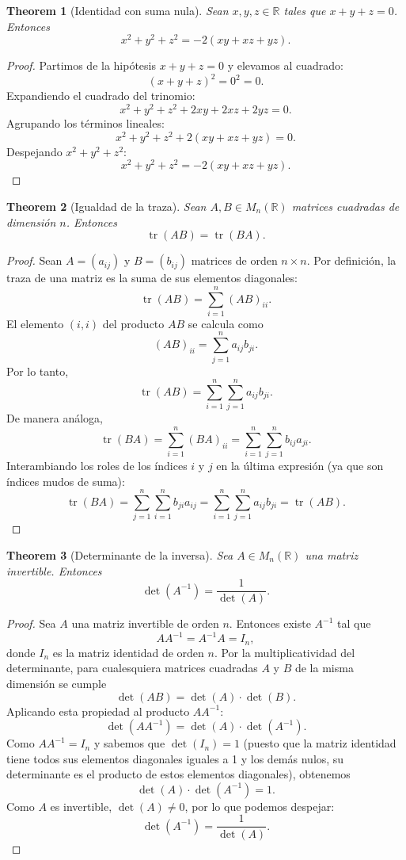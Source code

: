 \documentclass[11pt,a4paper]{article}
\theoremstyle{plain}
\newtheorem{theorem}{Theorem}[section]
\theoremstyle{definition}
\begin{document}
\begin{theorem}[Identidad con suma nula]
Sean $x, y, z \in \mathbb{R}$ tales que $x + y + z = 0$. Entonces
\[
x^2 + y^2 + z^2 = -2(xy + xz + yz).
\]
\end{theorem}

\begin{proof}
Partimos de la hipótesis $x + y + z = 0$ y elevamos al cuadrado:
\[
(x + y + z)^2 = 0^2 = 0.
\]
Expandiendo el cuadrado del trinomio:
\[
x^2 + y^2 + z^2 + 2xy + 2xz + 2yz = 0.
\]
Agrupando los términos lineales:
\[
x^2 + y^2 + z^2 + 2(xy + xz + yz) = 0.
\]
Despejando $x^2 + y^2 + z^2$:
\[
x^2 + y^2 + z^2 = -2(xy + xz + yz).
\]
\end{proof}

\begin{theorem}[Igualdad de la traza]
Sean $A, B \in M_n(\mathbb{R})$ matrices cuadradas de dimensión $n$. Entonces
\[
\operatorname{tr}(AB) = \operatorname{tr}(BA).
\]
\end{theorem}

\begin{proof}
Sean $A = (a_{ij})$ y $B = (b_{ij})$ matrices de orden $n \times n$. Por definición, la traza de una matriz es la suma de sus elementos diagonales:
\[
\operatorname{tr}(AB) = \sum_{i=1}^{n} (AB)_{ii}.
\]
El elemento $(i,i)$ del producto $AB$ se calcula como
\[
(AB)_{ii} = \sum_{j=1}^{n} a_{ij} b_{ji}.
\]
Por lo tanto,
\[
\operatorname{tr}(AB) = \sum_{i=1}^{n} \sum_{j=1}^{n} a_{ij} b_{ji}.
\]
De manera análoga,
\[
\operatorname{tr}(BA) = \sum_{i=1}^{n} (BA)_{ii} = \sum_{i=1}^{n} \sum_{j=1}^{n} b_{ij} a_{ji}.
\]
Interambiando los roles de los índices $i$ y $j$ en la última expresión (ya que son índices mudos de suma):
\[
\operatorname{tr}(BA) = \sum_{j=1}^{n} \sum_{i=1}^{n} b_{ji} a_{ij} = \sum_{i=1}^{n} \sum_{j=1}^{n} a_{ij} b_{ji} = \operatorname{tr}(AB).
\]
\end{proof}

\begin{theorem}[Determinante de la inversa]
Sea $A \in M_n(\mathbb{R})$ una matriz invertible. Entonces
\[
\det(A^{-1}) = \frac{1}{\det(A)}.
\]
\end{theorem}

\begin{proof}
Sea $A$ una matriz invertible de orden $n$. Entonces existe $A^{-1}$ tal que
\[
AA^{-1} = A^{-1}A = I_n,
\]
donde $I_n$ es la matriz identidad de orden $n$. Por la multiplicatividad del determinante, para cualesquiera matrices cuadradas $A$ y $B$ de la misma dimensión se cumple
\[
\det(AB) = \det(A)\cdot\det(B).
\]
Aplicando esta propiedad al producto $AA^{-1}$:
\[
\det(AA^{-1}) = \det(A)\cdot\det(A^{-1}).
\]
Como $AA^{-1} = I_n$ y sabemos que $\det(I_n) = 1$ (puesto que la matriz identidad tiene todos sus elementos diagonales iguales a 1 y los demás nulos, su determinante es el producto de estos elementos diagonales), obtenemos
\[
\det(A)\cdot\det(A^{-1}) = 1.
\]
Como $A$ es invertible, $\det(A) \neq 0$, por lo que podemos despejar:
\[
\det(A^{-1}) = \frac{1}{\det(A)}.
\]
\end{proof}
\end{document}
